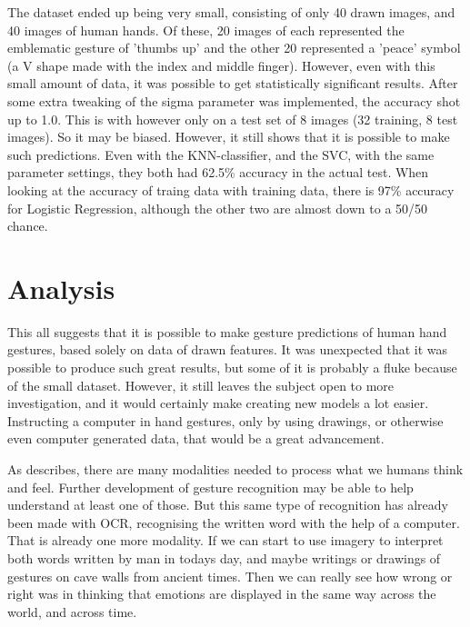 \documentclass[11pt,a4paper]{article}
\begin{document}
The dataset ended up being very small, consisting of only 40 drawn images, and 40 images of human hands. Of these, 20 images of each represented the emblematic gesture of 'thumbs up' and the other 20 represented a 'peace' symbol (a V shape made with the index and middle finger). However, even with this small amount of data, it was possible to get statistically significant results. After some extra tweaking of the sigma parameter was implemented, the accuracy shot up to 1.0. This is with however only on a test set of 8 images (32 training, 8 test images). So it may be biased. However, it still shows that it is possible to make such predictions. Even with the KNN-classifier, and the SVC, with the same parameter settings, they both had 62.5\% accuracy in the actual test. When looking at the accuracy of traing data with training data, there is 97\% accuracy for Logistic Regression, although the other two are almost down to a 50/50 chance.


\section{Analysis}
\label{sec:analysis-1}

This all suggests that it is possible to make gesture predictions of human hand gestures, based solely on data of drawn features. It was unexpected that it was possible to produce such great results, but some of it is probably a fluke because of the small dataset. However, it still leaves the subject open to more investigation, and it would certainly make creating new models a lot easier. Instructing a computer in hand gestures, only by using drawings, or otherwise even computer generated data, that would be a great advancement.

\vspace{0.5pc}

As \cite{ruiter} describes, there are many modalities needed to process what we humans think and feel. Further development of gesture recognition may be able to help understand at least one of those. But this same type of recognition has already been made with OCR, recognising the written word with the help of a computer. That is already one more modality. If we can start to use imagery to interpret both words written by man in todays day, and maybe writings or drawings of gestures on cave walls from ancient times. Then we can really see how wrong or right \cite{ekman} was in thinking that emotions are displayed in the same way across the world, and across time.
\end{document}
